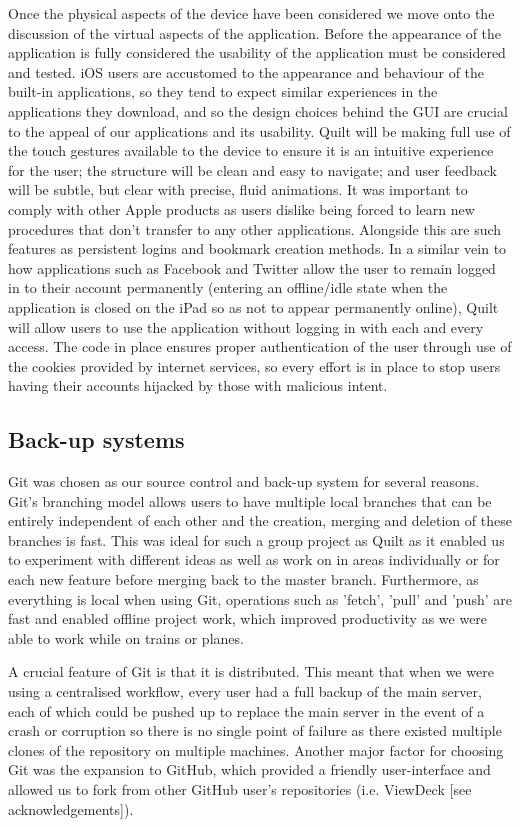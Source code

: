 \documentclass[a4wide, 10pt]{article}
\begin{document}
Once the physical aspects of the device have been considered we move onto the discussion of the virtual aspects of the application. Before the appearance of the application is fully considered the usability of the application must be considered and tested. iOS users are accustomed to the appearance and behaviour of the built-in applications, so they tend to expect similar experiences in the applications they download, and so the design choices behind the GUI are crucial to the appeal of our applications and its usability. Quilt will be making full use of the touch gestures available to the device to ensure it is an intuitive experience for the user; the structure will be clean and easy to navigate; and user feedback will be subtle, but clear with precise, fluid animations. It was important to comply with other Apple products as users dislike being forced to learn new procedures that don't transfer to any other applications. Alongside this are such features as persistent logins and bookmark creation methods. In a similar vein to how applications such as Facebook and Twitter allow the user to remain logged in to their account permanently (entering an offline/idle state when the application is closed on the iPad so as not to appear permanently online), Quilt will allow users to use the application without logging in with each and every access. The code in place ensures proper authentication of the user through use of the cookies provided by internet services, so every effort is in place to stop users having their accounts hijacked by those with malicious intent. 

\subsection{Back-up systems}

Git was chosen as our source control and back-up system for several reasons. Git's branching model allows users to have multiple local branches that can be entirely independent of each other and the creation, merging and deletion of these branches is fast. This was ideal for such a group project as Quilt as it enabled us to experiment with different ideas as well as work on in areas individually or for each new feature before merging back to the master branch. Furthermore, as everything is local when using Git, operations such as 'fetch', 'pull' and 'push' are fast and enabled offline project work, which improved productivity as we were able to work while on trains or planes.  

A crucial feature of Git is that it is distributed. This meant that when we were using a centralised workflow, every user had a full backup of the main server, each of which could be pushed up to replace the main server in the event of a crash or corruption so there is no single point of failure as there existed multiple clones of the repository on multiple machines. Another major factor for choosing Git was the expansion to GitHub, which provided a friendly user-interface and allowed us to fork from other GitHub user's repositories (i.e. ViewDeck [see acknowledgements]).
\end{document}
